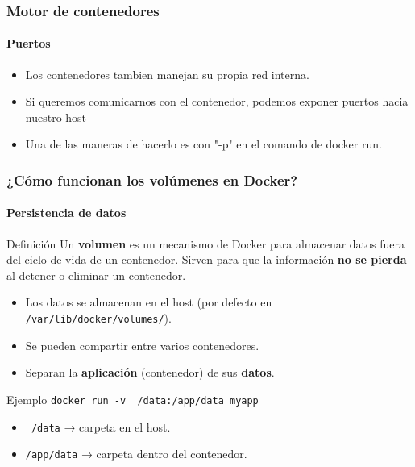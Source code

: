 
\begin{frame}
    \frametitle{Motor de contenedores}
    \framesubtitle{Puertos}
    \begin{block}{}
        \begin{itemize}
            \item Los contenedores tambien manejan su propia red interna.
            \item Si queremos comunicarnos con el contenedor, podemos exponer puertos hacia nuestro host
            \item Una de las maneras de hacerlo es con "-p" en el comando de docker run.
        \end{itemize}
    \end{block}{}
\end{frame}


\begin{frame}
    \frametitle{¿Cómo funcionan los volúmenes en Docker?}
    \framesubtitle{Persistencia de datos}

    \begin{block}{Definición}
        Un \textbf{volumen} es un mecanismo de Docker para almacenar datos 
        fuera del ciclo de vida de un contenedor.  
        Sirven para que la información \textbf{no se pierda} al detener o eliminar un contenedor.
    \end{block}

    \begin{itemize}
        \item Los datos se almacenan en el host (por defecto en \texttt{/var/lib/docker/volumes/}).
        \item Se pueden compartir entre varios contenedores.
        \item Separan la \textbf{aplicación} (contenedor) de sus \textbf{datos}.
    \end{itemize}

    \pause
    \begin{block}{Ejemplo}
        \texttt{docker run -v ~/data:/app/data myapp}
        
        \begin{itemize}
            \item \texttt{~/data} → carpeta en el host.
            \item \texttt{/app/data} → carpeta dentro del contenedor.
        \end{itemize}
    \end{block}
\end{frame}

